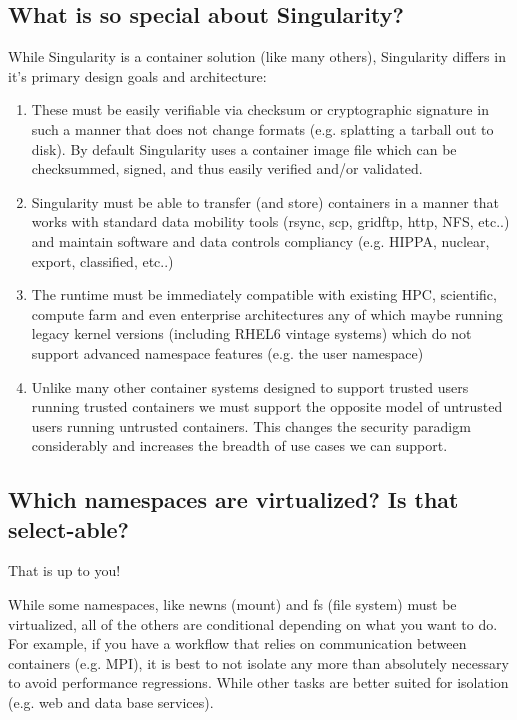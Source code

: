 \documentclass[letterpaper,10pt,english]{sphinxmanual}
\begin{document}
\subsection{What is so special about Singularity?}
\label{\detokenize{faq:what-is-so-special-about-singularity}}
While Singularity is a container solution (like many others), Singularity differs in it’s primary design goals and architecture:
\begin{enumerate}
\item {} 
 These must be easily verifiable via checksum or cryptographic signature in such a manner that does not change formats (e.g. splatting a tarball out to disk). By default Singularity uses a container image file which can be checksummed, signed, and thus easily verified and/or validated.

\item {} 
 Singularity must be able to transfer (and store) containers in a manner that works with standard data mobility tools (rsync, scp, gridftp, http, NFS, etc..) and maintain software and data controls compliancy (e.g. HIPPA, nuclear, export, classified, etc..)

\item {} 
 The runtime must be immediately compatible with existing HPC, scientific, compute farm and even enterprise architectures any of which maybe running legacy kernel versions (including RHEL6 vintage systems) which do not support advanced namespace features (e.g. the user namespace)

\item {} 
 Unlike many other container systems designed to support trusted users running trusted containers we must support the opposite model of untrusted users running untrusted containers. This changes the security paradigm considerably and increases the breadth of use cases we can support.

\end{enumerate}


\subsection{Which namespaces are virtualized? Is that select-able?}
\label{\detokenize{faq:which-namespaces-are-virtualized-is-that-select-able}}
That is up to you!

While some namespaces, like newns (mount) and fs (file system) must be virtualized, all of the others are conditional depending on what you want to do.
For example, if you have a workflow that relies on communication between containers (e.g. MPI), it is best to not isolate any more than absolutely
necessary to avoid performance regressions. While other tasks are better suited for isolation (e.g. web and data base services).
\end{document}
